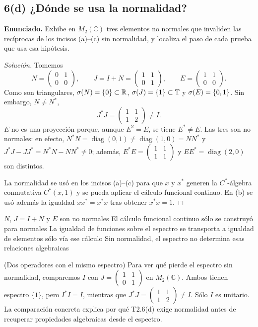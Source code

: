 \subsection*{6(d) ¿Dónde se usa la normalidad?}

\noindent\textbf{Enunciado.} Exhibe en $M_2(\mathbb C)$ tres elementos no normales que invaliden las recíprocas de los incisos (a)--(c) sin normalidad, y localiza el paso de cada prueba que usa esa hipótesis.

\begin{proof}[Solución]
Tomemos
\[
 N=\begin{pmatrix}0&1\\0&0\end{pmatrix},
 \qquad J=I+N=\begin{pmatrix}1&1\\0&1\end{pmatrix},
 \qquad E=\begin{pmatrix}1&1\\0&0\end{pmatrix}.
\]
Como son triangulares, $\sigma(N)=\{0\}\subset\mathbb R$,
$\sigma(J)=\{1\}\subset\mathbb T$ y $\sigma(E)=\{0,1\}$.
Sin embargo, $N\ne N^*$,
\[
 J^*J=\begin{pmatrix}1&1\\1&2\end{pmatrix}\ne I.
\]
$E$ no es una proyección porque, aunque $E^2=E$, se tiene $E^*\ne E$.
Las tres son no normales: en efecto,
$N^*N=\operatorname{diag}(0,1)\ne\operatorname{diag}(1,0)=NN^*$ y
$J^*J-JJ^*=N^*N-NN^*\ne0$; además,
$E^*E=\begin{pmatrix}1&1\\1&1\end{pmatrix}$ y
$EE^*=\operatorname{diag}(2,0)$ son distintos.

La normalidad se usó en los incisos (a)--(c) para que $x$ y $x^*$ generen la
$C^*$-álgebra conmutativa $C^*(x,1)$ y se pueda aplicar el cálculo funcional continuo.
En (b) se usó además la igualdad $xx^*=x^*x$ tras obtener $x^*x=1$.
\end{proof}

\proofdiagram
{$N$, $J=I+N$ y $E$ son no normales}
{El cálculo funcional continuo sólo se construyó para normales}
{La igualdad de funciones sobre el espectro se transporta a igualdad de elementos sólo vía ese cálculo}
{Sin normalidad, el espectro no determina esas relaciones algebraicas}

\begin{cthejemplo}{(Dos operadores con el mismo espectro)}
Para ver qué pierde el espectro sin normalidad, comparemos $I$ con
$J=\begin{pmatrix}1&1\\0&1\end{pmatrix}$ en $M_2(\mathbb C)$.
Ambos tienen espectro $\{1\}$, pero $I^*I=I$, mientras que
$J^*J=\begin{pmatrix}1&1\\1&2\end{pmatrix}\ne I$.
Sólo $I$ es unitario. La comparación concreta explica por qué T2.6(d) exige normalidad
antes de recuperar propiedades algebraicas desde el espectro.
\end{cthejemplo}

